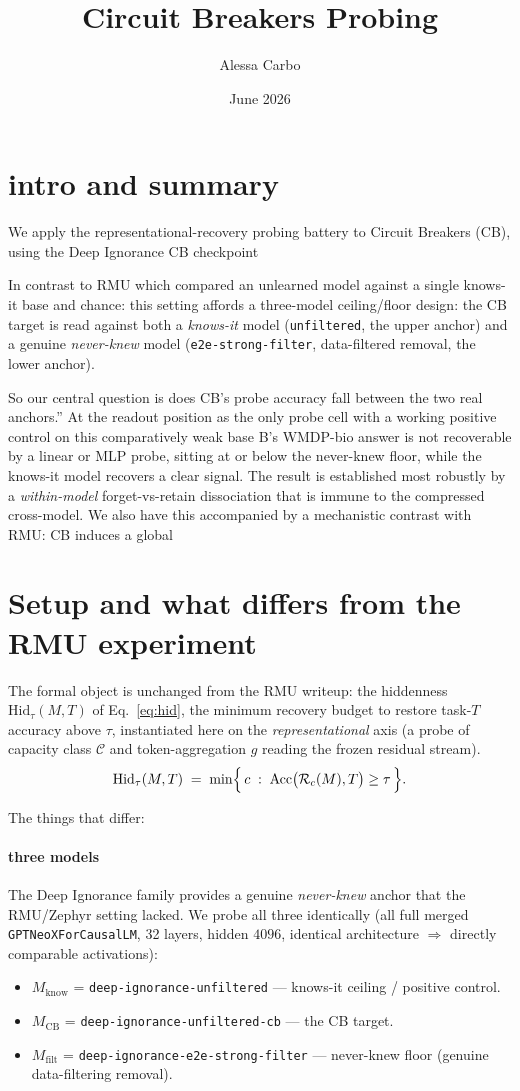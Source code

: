 \documentclass[11pt]{article}
\title{Circuit Breakers Probing}
\author{Alessa Carbo}
\date{June 2026}
\newcommand{\Hid}{\mathrm{Hid}}
\newcommand{\Acc}{\mathrm{Acc}}
\newcommand{\Rc}{\mathcal{R}}
\newcommand{\Mcb}{M_{\mathrm{CB}}}
\newcommand{\Mknows}{M_{\mathrm{know}}}
\newcommand{\Mnever}{M_{\mathrm{filt}}}
\begin{document}
\section{intro and summary}
We apply the representational-recovery probing battery to Circuit Breakers (CB), using the
Deep Ignorance CB checkpoint

In contrast to RMU which compared an unlearned model against a single knows-it base and
chance: this setting affords a three-model ceiling/floor design: the CB target is read
against both a \emph{knows-it} model (\texttt{unfiltered}, the upper anchor) and a genuine
\emph{never-knew} model (\texttt{e2e-strong-filter}, data-filtered removal, the lower anchor).

So our central question is does CB's probe accuracy
fall between the two real anchors.'' At the readout position as the only probe cell with a
working positive control on this comparatively weak base B's WMDP-bio answer is not
recoverable by a linear or MLP probe, sitting at or below the never-knew floor, while the
knows-it model recovers a clear signal. The result is established most robustly by a
\emph{within-model} forget-vs-retain dissociation that is immune to the compressed cross-model. We also have this accompanied by a mechanistic contrast with RMU: CB induces a global

\section{Setup and what differs from the RMU experiment}
 
The formal object is unchanged from the RMU writeup: the hiddenness $\Hid_\tau(M,T)$ of
Eq.~\eqref{eq:hid}, the minimum recovery budget to restore task-$T$ accuracy above $\tau$,
instantiated here on the \emph{representational} axis (a probe of capacity class $\mathcal{C}$
and token-aggregation $g$ reading the frozen residual stream).
\begin{equation}
\Hid_\tau(M, T) \;=\; \min\Bigl\{\, c \;:\; \Acc\bigl(\Rc_c(M), T\bigr) \ge \tau \,\Bigr\}.
\label{eq:hid}
\end{equation}

The things that differ: 

\paragraph{three models}
 The Deep Ignorance family provides a genuine
\emph{never-knew} anchor that the RMU/Zephyr setting lacked. We probe all three identically
(all full merged \texttt{GPTNeoXForCausalLM}, 32 layers, hidden $4096$, identical architecture
$\Rightarrow$ directly comparable activations):
\begin{itemize}[itemsep=2pt]
  \item $\Mknows$ = \texttt{deep-ignorance-unfiltered} --- knows-it ceiling / positive control.
  \item $\Mcb$ = \texttt{deep-ignorance-unfiltered-cb} --- the CB target.
  \item $\Mnever$ = \texttt{deep-ignorance-e2e-strong-filter} --- never-knew floor (genuine
        data-filtering removal).
\end{itemize}
\end{document}
